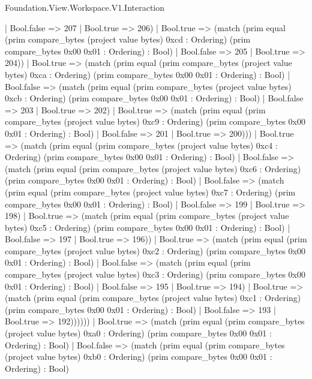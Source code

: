 \begin{lexlean}{Foundation.View.Workspace.V1.Interaction}
\begin{semanticmodule}
{                    | Bool.false => 207
                    | Bool.true => 206)
                  | Bool.true => (match (prim equal (prim compare_bytes (project value bytes) 0xcd : Ordering) (prim compare_bytes 0x00 0x01 : Ordering) : Bool)
                    | Bool.false => 205
                    | Bool.true => 204))
                | Bool.true => (match (prim equal (prim compare_bytes (project value bytes) 0xca : Ordering) (prim compare_bytes 0x00 0x01 : Ordering) : Bool)
                  | Bool.false => (match (prim equal (prim compare_bytes (project value bytes) 0xcb : Ordering) (prim compare_bytes 0x00 0x01 : Ordering) : Bool)
                    | Bool.false => 203
                    | Bool.true => 202)
                  | Bool.true => (match (prim equal (prim compare_bytes (project value bytes) 0xc9 : Ordering) (prim compare_bytes 0x00 0x01 : Ordering) : Bool)
                    | Bool.false => 201
                    | Bool.true => 200)))
              | Bool.true => (match (prim equal (prim compare_bytes (project value bytes) 0xc4 : Ordering) (prim compare_bytes 0x00 0x01 : Ordering) : Bool)
                | Bool.false => (match (prim equal (prim compare_bytes (project value bytes) 0xc6 : Ordering) (prim compare_bytes 0x00 0x01 : Ordering) : Bool)
                  | Bool.false => (match (prim equal (prim compare_bytes (project value bytes) 0xc7 : Ordering) (prim compare_bytes 0x00 0x01 : Ordering) : Bool)
                    | Bool.false => 199
                    | Bool.true => 198)
                  | Bool.true => (match (prim equal (prim compare_bytes (project value bytes) 0xc5 : Ordering) (prim compare_bytes 0x00 0x01 : Ordering) : Bool)
                    | Bool.false => 197
                    | Bool.true => 196))
                | Bool.true => (match (prim equal (prim compare_bytes (project value bytes) 0xc2 : Ordering) (prim compare_bytes 0x00 0x01 : Ordering) : Bool)
                  | Bool.false => (match (prim equal (prim compare_bytes (project value bytes) 0xc3 : Ordering) (prim compare_bytes 0x00 0x01 : Ordering) : Bool)
                    | Bool.false => 195
                    | Bool.true => 194)
                  | Bool.true => (match (prim equal (prim compare_bytes (project value bytes) 0xc1 : Ordering) (prim compare_bytes 0x00 0x01 : Ordering) : Bool)
                    | Bool.false => 193
                    | Bool.true => 192))))))
        | Bool.true => (match (prim equal (prim compare_bytes (project value bytes) 0xa0 : Ordering) (prim compare_bytes 0x00 0x01 : Ordering) : Bool)
          | Bool.false => (match (prim equal (prim compare_bytes (project value bytes) 0xb0 : Ordering) (prim compare_bytes 0x00 0x01 : Ordering) : Bool)
}
\end{semanticmodule}
\end{lexlean}

